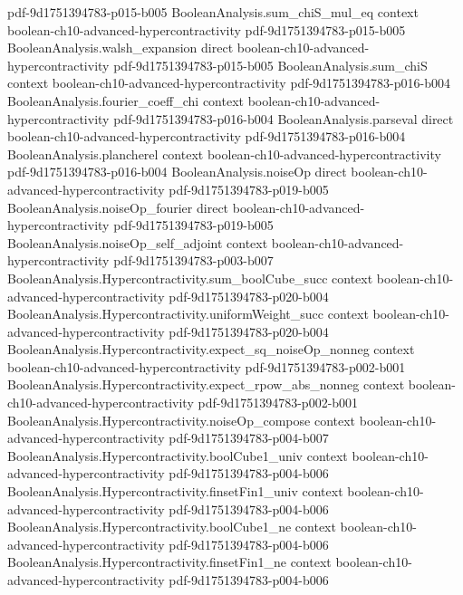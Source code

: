 \begin{theorem}
  {pdf-9d1751394783-p015-b005}
\proofstep
  {BooleanAnalysis.sum_chiS_mul_eq}
  {context}
  {boolean-ch10-advanced-hypercontractivity}
  {pdf-9d1751394783-p015-b005}
\proofstep
  {BooleanAnalysis.walsh_expansion}
  {direct}
  {boolean-ch10-advanced-hypercontractivity}
  {pdf-9d1751394783-p015-b005}
\proofstep
  {BooleanAnalysis.sum_chiS}
  {context}
  {boolean-ch10-advanced-hypercontractivity}
  {pdf-9d1751394783-p016-b004}
\proofstep
  {BooleanAnalysis.fourier_coeff_chi}
  {context}
  {boolean-ch10-advanced-hypercontractivity}
  {pdf-9d1751394783-p016-b004}
\proofstep
  {BooleanAnalysis.parseval}
  {direct}
  {boolean-ch10-advanced-hypercontractivity}
  {pdf-9d1751394783-p016-b004}
\proofstep
  {BooleanAnalysis.plancherel}
  {context}
  {boolean-ch10-advanced-hypercontractivity}
  {pdf-9d1751394783-p016-b004}
\proofstep
  {BooleanAnalysis.noiseOp}
  {direct}
  {boolean-ch10-advanced-hypercontractivity}
  {pdf-9d1751394783-p019-b005}
\proofstep
  {BooleanAnalysis.noiseOp_fourier}
  {direct}
  {boolean-ch10-advanced-hypercontractivity}
  {pdf-9d1751394783-p019-b005}
\proofstep
  {BooleanAnalysis.noiseOp_self_adjoint}
  {context}
  {boolean-ch10-advanced-hypercontractivity}
  {pdf-9d1751394783-p003-b007}
\proofstep
  {BooleanAnalysis.Hypercontractivity.sum_boolCube_succ}
  {context}
  {boolean-ch10-advanced-hypercontractivity}
  {pdf-9d1751394783-p020-b004}
\proofstep
  {BooleanAnalysis.Hypercontractivity.uniformWeight_succ}
  {context}
  {boolean-ch10-advanced-hypercontractivity}
  {pdf-9d1751394783-p020-b004}
\proofstep
  {BooleanAnalysis.Hypercontractivity.expect_sq_noiseOp_nonneg}
  {context}
  {boolean-ch10-advanced-hypercontractivity}
  {pdf-9d1751394783-p002-b001}
\proofstep
  {BooleanAnalysis.Hypercontractivity.expect_rpow_abs_nonneg}
  {context}
  {boolean-ch10-advanced-hypercontractivity}
  {pdf-9d1751394783-p002-b001}
\proofstep
  {BooleanAnalysis.Hypercontractivity.noiseOp_compose}
  {context}
  {boolean-ch10-advanced-hypercontractivity}
  {pdf-9d1751394783-p004-b007}
\proofstep
  {BooleanAnalysis.Hypercontractivity.boolCube1_univ}
  {context}
  {boolean-ch10-advanced-hypercontractivity}
  {pdf-9d1751394783-p004-b006}
\proofstep
  {BooleanAnalysis.Hypercontractivity.finsetFin1_univ}
  {context}
  {boolean-ch10-advanced-hypercontractivity}
  {pdf-9d1751394783-p004-b006}
\proofstep
  {BooleanAnalysis.Hypercontractivity.boolCube1_ne}
  {context}
  {boolean-ch10-advanced-hypercontractivity}
  {pdf-9d1751394783-p004-b006}
\proofstep
  {BooleanAnalysis.Hypercontractivity.finsetFin1_ne}
  {context}
  {boolean-ch10-advanced-hypercontractivity}
  {pdf-9d1751394783-p004-b006}

\end{theorem}
